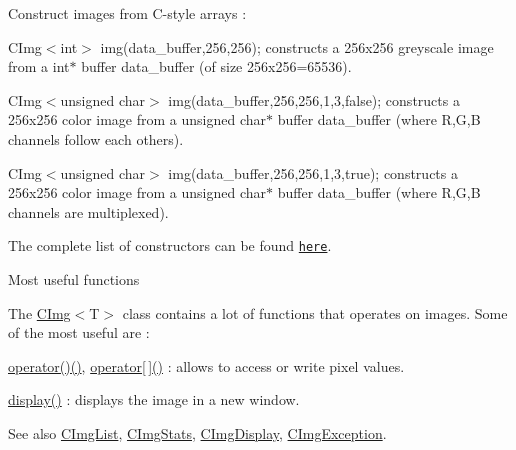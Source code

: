 \begin{DoxyItemize}
\item Construct images from C-\/style arrays :
\begin{DoxyItemize}
\item {\ttfamily CImg$<$int$>$ img(data\_\-buffer,256,256);} constructs a 256x256 greyscale image from a {\ttfamily int$\ast$} buffer {\ttfamily data\_\-buffer} (of size 256x256=65536).
\item {\ttfamily CImg$<$unsigned char$>$ img(data\_\-buffer,256,256,1,3,false);} constructs a 256x256 color image from a {\ttfamily unsigned} {\ttfamily char$\ast$} buffer {\ttfamily data\_\-buffer} (where R,G,B channels follow each others).
\item {\ttfamily CImg$<$unsigned char$>$ img(data\_\-buffer,256,256,1,3,true);} constructs a 256x256 color image from a {\ttfamily unsigned} {\ttfamily char$\ast$} buffer {\ttfamily data\_\-buffer} (where R,G,B channels are multiplexed).
\end{DoxyItemize}
\end{DoxyItemize}

The complete list of constructors can be found \href{#constructors}{\tt here}.

\begin{DoxyParagraph}{Most useful functions}

\end{DoxyParagraph}
The \hyperlink{structcimg__library_1_1_c_img}{CImg}$<$T$>$ class contains a lot of functions that operates on images. Some of the most useful are :


\begin{DoxyItemize}
\item \hyperlink{structcimg__library_1_1_c_img_ac26d10a2b16190e0f4949a009250d041}{operator()()}, \hyperlink{structcimg__library_1_1_c_img_a53ee85b82244ff16acd428e5ad655540}{operator\mbox{[}$\,$\mbox{]}()} : allows to access or write pixel values.
\item \hyperlink{structcimg__library_1_1_c_img_aab8c37b9dc626927623f68759fe83e83}{display()} : displays the image in a new window.
\end{DoxyItemize}

\begin{DoxySeeAlso}{See also}
\hyperlink{structcimg__library_1_1_c_img_list}{CImgList}, \hyperlink{structcimg__library_1_1_c_img_stats}{CImgStats}, \hyperlink{structcimg__library_1_1_c_img_display}{CImgDisplay}, \hyperlink{structcimg__library_1_1_c_img_exception}{CImgException}. 
\end{DoxySeeAlso}


